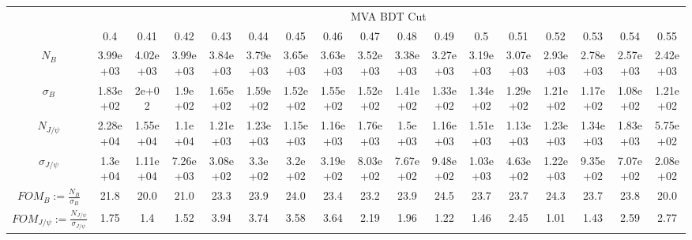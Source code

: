 \begin{table}[!h]
\centering
\begin{adjustbox}{width=18cm, rotate=90}
\begin{tabular}{*{1}{c|}*{16}{c}}
& \multicolumn{16}{c}{MVA BDT Cut}\\
& 0.4& 0.41& 0.42& 0.43& 0.44& 0.45& 0.46& 0.47& 0.48& 0.49& 0.5& 0.51& 0.52& 0.53& 0.54& 0.55\\ \hline
$N_B$& 3.99e+03& 4.02e+03& 3.99e+03& 3.84e+03& 3.79e+03& 3.65e+03& 3.63e+03& 3.52e+03& 3.38e+03& 3.27e+03& 3.19e+03& 3.07e+03& 2.93e+03& 2.78e+03& 2.57e+03& 2.42e+03\\
$\sigma_B$& 1.83e+02& 2e+02& 1.9e+02& 1.65e+02& 1.59e+02& 1.52e+02& 1.55e+02& 1.52e+02& 1.41e+02& 1.33e+02& 1.34e+02& 1.29e+02& 1.21e+02& 1.17e+02& 1.08e+02& 1.21e+02\\
$N_{J/\psi}$& 2.28e+04& 1.55e+04& 1.1e+04& 1.21e+03& 1.23e+03& 1.15e+03& 1.16e+03& 1.76e+03& 1.5e+03& 1.16e+03& 1.51e+03& 1.13e+03& 1.23e+03& 1.34e+03& 1.83e+03& 5.75e+02\\
$\sigma_{J/\psi}$& 1.3e+04& 1.11e+04& 7.26e+03& 3.08e+02& 3.3e+02& 3.2e+02& 3.19e+02& 8.03e+02& 7.67e+02& 9.48e+02& 1.03e+03& 4.63e+02& 1.22e+03& 9.35e+02& 7.07e+02& 2.08e+02\\ \hline
$FOM_{B}:=\frac{N_B}{\sigma_B}$& 21.8& 20.0& 21.0& 23.3& 23.9& 24.0& 23.4& 23.2& 23.9& 24.5& 23.7& 23.7& 24.3& 23.7& 23.8& 20.0\\
$FOM_{J/\psi}:=\frac{N_{J/\psi}}{\sigma_{J/\psi}}$& 1.75& 1.4& 1.52& 3.94& 3.74& 3.58& 3.64& 2.19& 1.96& 1.22& 1.46& 2.45& 1.01& 1.43& 2.59& 2.77\\ \hline
\end{tabular}
\end{adjustbox}
\end{table}
